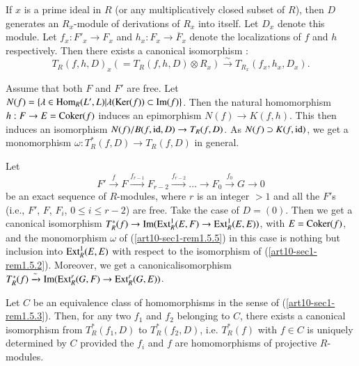 \begin{subremark}\label{art10-sec1-rem1.5.4}
If $x$ is a prime ideal in $R$ (or any multiplicatively closed subset of $R$), then $D$ generates an $R_{x}$-module of derivations of $R_{x}$ into itself. Let $D_{x}$ denote this module. Let $f_{x}:F'_{x}\to F_{x}$ and $h_{x}:F_{x}\to \overline{F}_{x}$ denote the localizations of $f$ and $h$ respectively. Then there exists a canonical isomorphism :
$$
T_{R}(f,h,D)_{x}(=T_{R}(f,h,D)\otimes R_{x})\xrightarrow{\sim}T_{R_{x}}(f_{x},h_{x},D_{x}).
$$
\end{subremark}

\begin{subremark}\label{art10-sec1-rem1.5.5}
Assume that both $F$ and $F'$ are free. Let $N(f)=\{\lambda\in \operatorname{\mathrm{Hom}}_{R}(L',L)|\lambda(\operatorname{\mathrm{Ker}} (f))\subset \operatorname{\mathrm{Im}}(f)\}$. Then the natural homomorphism $h:F\to E=\operatorname{\mathrm{Coker}}(f)$ induces an epimorphism $N(f)\to K(f,h)$. This then induces an isomorphism $N(f)/B(f,\operatorname{\mathrm{id}},D)\to T_{R}(f,D)$. As $N(f)\supset K(f,\operatorname{\mathrm{id}})$, we get a monomorphism $\omega:T^{*}_{R}(f,D)\to T_{R}(f,D)$ in general.
\end{subremark}

\begin{subremark}\label{art10-sec1-rem1.5.6}
Let
$$
F'\xrightarrow{f}F\xrightarrow{f_{r-1}}F_{r-2}\xrightarrow{f_{r-2}}\ldots\to F_{0}\xrightarrow{f_{0}}G\to 0
$$
be an exact sequence of $R$-modules, where $r$ is an integer $>1$ and all the $F'$s (i.e., $F'$, $F$, $F_{i}$, $0\leq i\leq r-2$) are free. Take the case of $D=(0)$. Then we get a canonical isomorphism $T^{*}_{R}(f)\to \operatorname{\mathrm{Im}} (\operatorname{\mathrm{Ext}}^{1}_{R}(E,F)\to \operatorname{\mathrm{Ext}}^{1}_{R}(E,E))$, with $E=\operatorname{\mathrm{Coker}} (f)$, and the monomorphism $\omega$ of (\ref{art10-sec1-rem1.5.5}) in this case is nothing but inclusion into $\operatorname{\mathrm{Ext}}^{1}_{R}(E,E)$ with respect to the isomorphism of (\ref{art10-sec1-rem1.5.2}). Moreover, we get a canonical\pageoriginale isomorphism $T^{*}_{R}(f)\xrightarrow{\sim}\operatorname{\mathrm{Im}}(\operatorname{\mathrm{Ext}}^{r}_{R}(G,F)\to \operatorname{\mathrm{Ext}}^{r}_{R}(G,E))$.
\end{subremark}

\begin{subremark}\label{art10-sec1-rem1.5.7}
Let $C$ be an equivalence class of homomorphisms in the sense of (\ref{art10-sec1-rem1.5.3}). Then, for any two $f_{1}$ and $f_{2}$ belonging to $C$, there exists a canonical isomorphism from $T^{*}_{R}(f_{1},D)$ to $T^{*}_{R}(f_{2},D)$, i.e. $T^{*}_{R}(f)$ with $f\in C$ is uniquely determined by $C$ provided the $f_{i}$ and $f$ are homomorphisms of projective $R$-modules.
\end{subremark}

